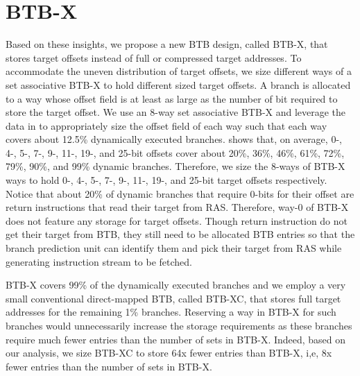 \section{BTB-X}

Based on these insights, we propose a new BTB design, called BTB-X, that stores target offsets instead of full or compressed target addresses. To accommodate the uneven distribution of target offsets, we size different ways of a set associative BTB-X to hold different sized target offsets. A branch is allocated to a way whose offset field is at least as large as the number of bit required to store the target offset. We use an 8-way set associative BTB-X and leverage the data in  to appropriately size the offset field of each way such that each way covers about 12.5\% dynamically executed branches.  shows that, on average, 0-, 4-, 5-, 7-, 9-, 11-, 19-, and 25-bit offsets cover about 20\%, 36\%, 46\%, 61\%, 72\%, 79\%, 90\%, and 99\% dynamic branches. Therefore, we size the 8-ways of BTB-X ways to hold 0-, 4-, 5-, 7-, 9-, 11-, 19-, and 25-bit target offsets respectively. Notice that about 20\% of dynamic branches that require 0-bits for their offset are return instructions that read their target from RAS. Therefore, way-0 of BTB-X does not feature any storage for target offsets. Though return instruction do not get their target from BTB, they still need to be allocated BTB entries so that the branch prediction unit can identify them and pick their target from RAS while generating instruction stream to be fetched.

BTB-X covers 99\% of the dynamically executed branches and we employ a very small conventional direct-mapped BTB, called BTB-XC, that stores full target addresses for the remaining 1\% branches. Reserving a way in BTB-X for such branches would unnecessarily increase the storage requirements as these branches require much fewer entries than the number of sets in BTB-X. Indeed, based on our analysis, we size BTB-XC to store 64x fewer entries than BTB-X, i,e, 8x fewer entries than the number of sets in BTB-X.



